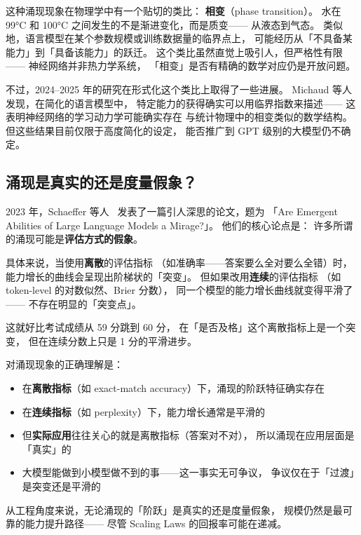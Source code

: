 这种涌现现象在物理学中有一个贴切的类比：
\textbf{相变}（phase transition）。
水在 99°C 和 100°C 之间发生的不是渐进变化，而是质变——
从液态到气态。
类似地，语言模型在某个参数规模或训练数据量的临界点上，
可能经历从「不具备某能力」到「具备该能力」的跃迁。
这个类比虽然直觉上吸引人，但严格性有限——
神经网络并非热力学系统，
「相变」是否有精确的数学对应仍是开放问题。

不过，2024--2025 年的研究在形式化这个类比上取得了一些进展。
Michaud 等人发现，在简化的语言模型中，
特定能力的获得确实可以用临界指数来描述——
这表明神经网络的学习动力学可能确实存在
与统计物理中的相变类似的数学结构。
但这些结果目前仅限于高度简化的设定，
能否推广到 GPT 级别的大模型仍不确定。

\subsection{涌现是真实的还是度量假象？}

2023 年，Schaeffer 等人~\cite{schaeffer2023mirage}
发表了一篇引人深思的论文，题为
「Are Emergent Abilities of Large Language Models a Mirage?」。
他们的核心论点是：
许多所谓的涌现可能是\textbf{评估方式的假象}。

具体来说，当使用\textbf{离散}的评估指标
（如准确率——答案要么全对要么全错）时，
能力增长的曲线会呈现出阶梯状的「突变」。
但如果改用\textbf{连续}的评估指标
（如 token-level 的对数似然、Brier 分数），
同一个模型的能力增长曲线就变得平滑了——
不存在明显的「突变点」。

这就好比考试成绩从 59 分跳到 60 分，
在「是否及格」这个离散指标上是一个突变，
但在连续分数上只是 1 分的平滑进步。

\begin{warnbox}[涌现之争的现状]
对涌现现象的正确理解是：
\begin{itemize}[noitemsep]
  \item 在\textbf{离散指标}（如 exact-match accuracy）下，涌现的阶跃特征确实存在
  \item 在\textbf{连续指标}（如 perplexity）下，能力增长通常是平滑的
  \item 但\textbf{实际应用}往往关心的就是离散指标（答案对不对），
        所以涌现在应用层面是「真实」的
  \item 大模型能做到小模型做不到的事——这一事实无可争议，
        争议仅在于「过渡」是突变还是平滑的
\end{itemize}
\end{warnbox}

从工程角度来说，无论涌现的「阶跃」是真实的还是度量假象，
规模仍然是最可靠的能力提升路径——
尽管 Scaling Laws 的回报率可能在递减。

